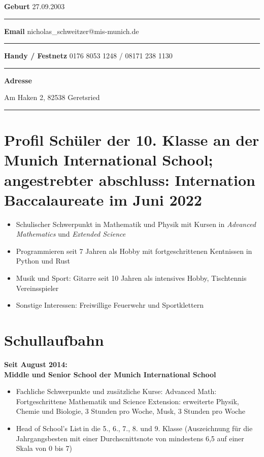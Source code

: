\documentclass[12pt]{article}
\newcommand{\sect}[1]{\vspace{-12pt}\section*{#1}\vspace{-12pt}}
\newcommand{\sep}{{\color{gray}\vspace{-12pt}\hrule}}
\begin{document}
\textbf{Geburt} \hfill{27.09.2003} \, \\
\sep
\textbf{Email} \hfill{nicholas\_schweitzer@mis-munich.de} \, \\
\sep
\textbf{Handy / Festnetz} \hfill{0176 8053 1248 / 08171 238 1130} \, \\
\sep
\textbf{Adresse} \hfill{Am Haken 2, 82538 Geretsried \, \\
  \sep

  \sect{Profil
    Sch{\"u}ler der 10. Klasse an der Munich International School; angestrebter
    abschluss: Internation Baccalaureate im Juni 2022
  }
  \begin{itemize}
    \itemsep3pt

  \item Schulischer Schwerpunkt in Mathematik und Physik mit Kursen in \textit{\glqq
    Advanced Mathematics\grqq} und \textit{\glqq Extended Science\grqq}

  \item Programmieren seit 7 Jahren als Hobby mit fortgeschrittenen Kentnissen in
    Python und Rust

  \item Musik und Sport: Gitarre seit 10 Jahren als intensives Hobby,
    Tischtennis Vereinsspieler

  \item Sonstige Interessen: Freiwillige Feuerwehr und Sportklettern

  \end{itemize}
  \vspace{-12pt}

  \sect{Schullaufbahn}

  \textbf{Seit August 2014: \\
    Middle und Senior School der Munich International School
  }

  \vspace{-10pt}
  \begin{itemize}
    \itemsep3pt
  \item Fachliche Schwerpunkte und zus{\"a}tzliche Kurse: \glqq Advanced
    Math\grqq: Fortgeschrittene Mathematik und \glqq Science Extension\grqq:
    erweiterte Physik, Chemie und Biologie, 3 Stunden pro Woche, Musk, 3 Stunden
    pro Woche

  \item \glqq Head of School's List\grqq \,in die 5., 6., 7., 8. und 9. Klasse
    (Auszeichnung f{\"u}r die Jahrgangsbesten mit einer Durchscnittsnote von
    mindestens 6,5 auf einer Skala von 0 bis 7)


\end{itemize}}
\end{document}
